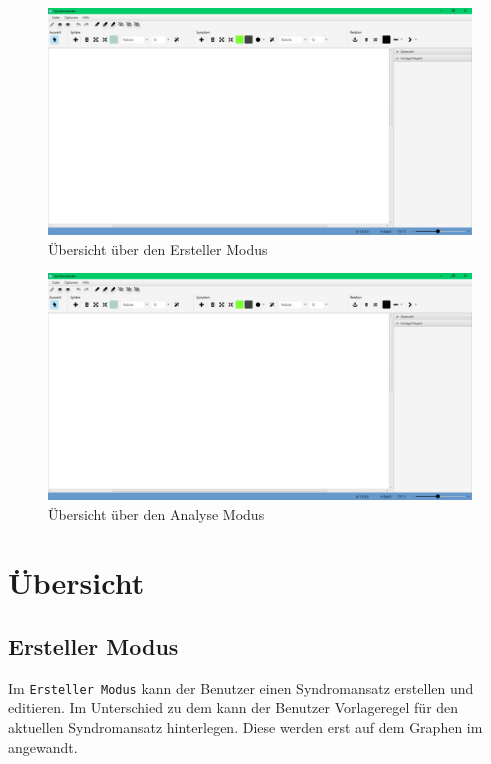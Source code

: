 \documentclass[enabledeprecatedfontcommands,fontsize=11pt,paper=a4,twoside]{scrartcl}
\begin{document}
	\begin{landscape}
		\begin{figure}
			\centering
			\includegraphics[width=22cm]{overview.png}
			\caption{Übersicht über den Ersteller Modus}
			\label{fig:label}
		\end{figure}
	\end{landscape}
	\begin{landscape}
		\begin{figure}
		\centering
		\includegraphics[width=22cm]{overview.png}
		\caption{Übersicht über den Analyse Modus}
		\label{fig:label}
		\end{figure}
	\end{landscape}

	

	
\newpage	
\section{Übersicht} \label{sec:uebersicht}
\subsection{Ersteller Modus}
Im \texttt{Ersteller Modus} kann der Benutzer einen Syndromansatz erstellen und editieren. Im Unterschied zu dem  kann der Benutzer Vorlageregel für den aktuellen Syndromansatz hinterlegen. Diese werden erst auf dem Graphen im  angewandt. 
\end{document}
